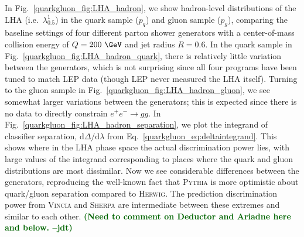 \documentclass[11pt]{cernrep}
\newcommand{\jdt}[1]{\textbf{\textcolor{darkgreen}{(#1 --jdt)}}}
\begin{document}
In Fig.~\ref{quarkgluon_fig:LHA_hadron}, we show hadron-level distributions of the LHA (i.e.~$\lambda_{0.5}^1$) in the quark sample ($p_q$) and gluon sample ($p_g$), comparing the baseline settings of four different parton shower generators with a center-of-mass collision energy of $Q = 200~\GeV$ and jet radius $R = 0.6$. In the quark sample in Fig.~\ref{quarkgluon_fig:LHA_hadron_quark}, there is relatively little variation between the generators, which is not surprising since all four programs have been tuned to match LEP data (though LEP never measured the LHA itself).  Turning to the gluon sample in Fig.~\ref{quarkgluon_fig:LHA_hadron_gluon}, we see somewhat larger variations between the generators; this is expected since there is no data to directly constrain $e^+ e^- \to gg$.  In Fig.~\ref{quarkgluon_fig:LHA_hadron_separation}, we plot the integrand of classifier separation, $\text{d} \Delta / \text{d} \lambda$ from Eq.~\eqref{quarkgluon_eq:deltaintegrand}. This shows where in the LHA phase space the actual discrimination power lies, with large values of the integrand
corresponding to places where the quark and gluon distributions are
most dissimilar.  Now we see considerable differences between the
generators, reproducing the well-known fact that \textsc{Pythia} is
more optimistic about quark/gluon separation compared to
\textsc{Herwig}.  The prediction discrimination power from
\textsc{Vincia} and \textsc{Sherpa} are intermediate between these
extremes and similar to each other.  \jdt{Need to comment on Deductor and Ariadne here and below.}
\end{document}
